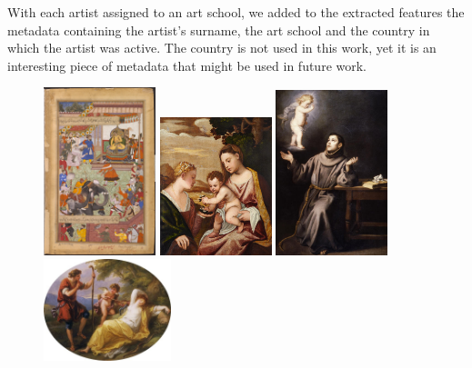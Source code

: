 \documentclass[11pt,a4paper,twoside,openright]{report}
\begin{document}
With each artist assigned to an art school, we added to the extracted features
the metadata containing the artist's surname, the art school and the country in
which the artist was active.  The country is not used in this work, yet it is
an interesting piece of metadata that might be used in future work.

\begin{figure}[tbp]
\centering
\includegraphics[width=0.29\textwidth]{basawan_2009BX3686}
\includegraphics[width=0.29\textwidth]{titian_eu_741}
\includegraphics[width=0.29\textwidth]{murillo_1974p24}
\includegraphics[width=0.33\textwidth]{kauffmann_va_pc_2006an1773}

\end{figure}
\end{document}
